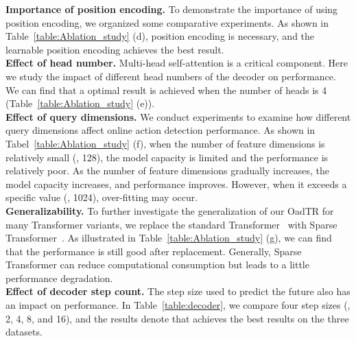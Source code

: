 \documentclass[10pt,twocolumn,letterpaper]{article}
\begin{document}
{\begin{table}[t]
\begin{tabular}
    \end{tabular}
    \vspace{-5pt}
    \caption{
        Comparison of different fusion methods and the necessity of the encoder feature encoding.
    }
    \vspace{-3pt}
    \label{table:aggregation_type}
\end{table}
\noindent\textbf{Importance of position encoding.} To demonstrate the importance of using position encoding, we organized some comparative experiments. As shown in Table~\ref{table:Ablation_study} (d), position encoding is necessary, and the learnable position encoding achieves the best result.
\vspace{+3pt}
\\
\textbf{Effect of head number.} Multi-head self-attention is a critical component. Here we study the impact of different head numbers of the decoder on performance. We can find that a optimal result is achieved when the number of heads is 4 (Table~\ref{table:Ablation_study} (e)). 
\vspace{+3pt}
\\
\textbf{Effect of query dimensions.} We conduct experiments to examine how different query dimensions affect online action detection performance. As shown in Tabel~\ref{table:Ablation_study} (f), when the number of feature dimensions is relatively small (\eg, 128), the model capacity is limited and the performance is relatively poor. As the number of feature dimensions gradually increases, the model capacity increases, and performance improves. However, when it exceeds a specific value (\eg, 1024), over-fitting may occur. 
\vspace{+3pt}
\\
\textbf{Generalizability.} To further investigate the generalization of our OadTR for many Transformer variants, we replace the standard Transformer~\cite{Transformer} with Sparse Transformer~\cite{sparse_Transformer}. As illustrated in Table~\ref{table:Ablation_study} (g), we can find that the performance is still good after replacement. Generally, Sparse Transformer can reduce computational consumption but leads to a little performance degradation.
\vspace{+3pt}
\\
\textbf{Effect of decoder step count.} The step size used to predict the future also has an impact on performance. In Table~\ref{table:decoder}, we compare four step sizes (\ie, 2, 4, 8, and 16), and the results denote that  achieves the best results on the three datasets. \vspace{+3pt}
}
\end{document}

